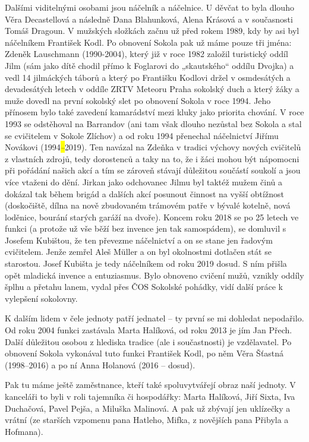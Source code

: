 Dalšími viditelnými osobami jsou náčelník a náčelnice. U děvčat to byla
dlouho Věra Decastellová a následně Dana Blahunková, Alena Krásová a v
současnosti Tomáš Dragoun. V mužských složkách začnu už před rokem 1989,
kdy by asi byl náčelníkem František Kodl. Po obnovení Sokola pak už máme
pouze tři jména: Zdeněk Lauschmann (1990-2004), který již v roce 1982
založil turistický oddíl Jilm (sám jako dítě chodil přímo k Foglarovi do
„skautského`` oddílu Dvojka) a vedl 14 jilmáckých táborů a který po
Františku Kodlovi držel v osmdesátých a devadesátých letech v oddíle
ZRTV Meteoru Praha sokolský duch a který žáky a muže dovedl na první
sokolský slet po obnovení Sokola v roce 1994. Jeho přínosem bylo také
zavedení kamarádství mezi kluky jako priorita chování. V roce 1993 se
odstěhoval na Barrandov (ani tam však dlouho nezůstal bez Sokola a stal
se cvičitelem v Sokole Zlíchov) a od roku 1994 přenechal náčelnictví
Jiřímu Novákovi (1994\emph{\hl{--}}2019). Ten navázal na Zdeňka v
tradici výchovy nových cvičitelů z vlastních zdrojů, tedy dorostenců a
taky na to, že i žáci mohou být nápomocni při pořádání našich akcí a tím
se zároveň stávají důležitou součástí soukolí a jsou více vtaženi do
dění. Jirkan jako odchovanec Jilmu byl taktéž mužem činů a dokázal tak
během brigád a dalších akcí posunout činnost na vyšší obtížnost
(doskočiště, dílna na nově zbudovaném trámovém patře v bývalé kotelně,
nová loděnice, bourání starých garáží na dvoře). Koncem roku 2018 se po
25 letech ve funkci (a protože už vše běží bez invence jen tak
samospádem), se domluvil s Josefem Kubištou, že ten převezme náčelnictví
a on se stane jen řadovým cvičitelem. Jenže zemřel Aleš Müller a on byl
okolnostmi dotlačen stát se starostou. Josef Kubišta je tedy náčelníkem
od roku 2019 dosud. S ním přišla opět mladická invence a entuziasmus.
Bylo obnoveno cvičení mužů, vznikly oddíly šplhu a přetahu lanem, vydal
přes ČOS Sokolské pohádky, vidí další práce k vylepšení sokolovny.

K dalším lidem v čele jednoty patří jednatel -- ty první se mi dohledat
nepodařilo. Od roku 2004 funkci zastávala Marta Halíková, od roku 2013
je jím Jan Přech. Další důležitou osobou z hlediska tradice (ale i
součastnosti) je vzdělavatel. Po obnovení Sokola vykonával tuto funkci
František Kodl, po něm Věra Šťastná (1998--2016) a po ní Anna Holanová
(2016 -- dosud).

Pak tu máme ještě zaměstnance, kteří také spoluvytvářejí obraz naší
jednoty. V kanceláři to byli v roli tajemníka či hospodářky: Marta
Halíková, Jiří Sixta, Iva Duchačová, Pavel Pejša, a Miluška Malinová. A
pak už zbývají jen uklízečky a vrátní (ze starších vzpomenu pana
Hatleho, Mifka, z novějších pana Přibyla a Hofmana).

